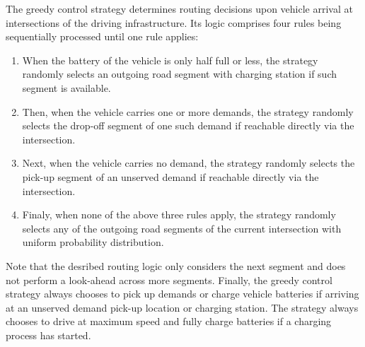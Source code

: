 \documentclass[a4paper,twoside]{article}
\begin{document}
	The greedy control strategy 
	determines routing decisions upon vehicle arrival at intersections of the driving infrastructure.
	Its logic comprises four rules being sequentially processed until one rule applies:
	\begin{enumerate}
		\item When the battery of the vehicle is only half full or less, the strategy randomly selects an outgoing road segment with charging station if such segment is available.
		\item Then, when the vehicle carries one or more demands, the strategy randomly selects the drop-off segment of one such demand if reachable directly via the intersection.
		\item Next, when the vehicle carries no demand, the strategy randomly selects the pick-up segment of an unserved demand if reachable directly via the intersection.
		\item Finaly, when none of the above three rules apply, the strategy randomly selects any of the outgoing road segments of the current intersection with uniform probability distribution.
	\end{enumerate}
	Note that the desribed routing logic only considers the next segment and does not perform a look-ahead across more segments.
	Finally, the greedy control strategy always chooses to pick up demands or charge vehicle batteries if arriving at an unserved demand pick-up location or charging station.
	The strategy always chooses to drive at maximum speed and fully charge batteries if a charging process has started.
	
\end{document}
